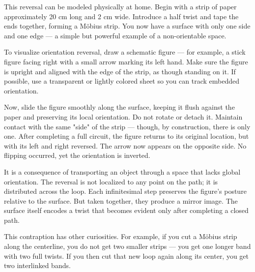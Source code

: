 \begin{commentary}
This reversal can be modeled physically at home. Begin with a strip of paper approximately 20 cm long and 2 cm wide. Introduce a half twist and tape the ends together, forming a Möbius strip. You now have a surface with only one side and one edge — a simple but powerful example of a non-orientable space.

To visualize orientation reversal, draw a schematic figure — for example, a stick figure facing right with a small arrow marking its left hand. Make sure the figure is upright and aligned with the edge of the strip, as though standing on it. If possible, use a transparent or lightly colored sheet so you can track embedded orientation.

Now, slide the figure smoothly along the surface, keeping it flush against the paper and preserving its local orientation. Do not rotate or detach it. Maintain contact with the same "side" of the strip — though, by construction, there is only one. After completing a full circuit, the figure returns to its original location, but with its left and right reversed. The arrow now appears on the opposite side. No flipping occurred, yet the orientation is inverted.

It is a consequence of transporting an object through a space that lacks global orientation. The reversal is not localized to any point on the path; it is distributed across the loop. Each infinitesimal step preserves the figure's posture relative to the surface. But taken together, they produce a mirror image. The surface itself encodes a twist that becomes evident only after completing a closed path.

This contraption has other curiosities. For example, if you cut a Möbius strip along the centerline, you do not get two smaller strips — you get one longer band with two full twists. If you then cut that new loop again along its center, you get two interlinked bands.

\end{commentary}


